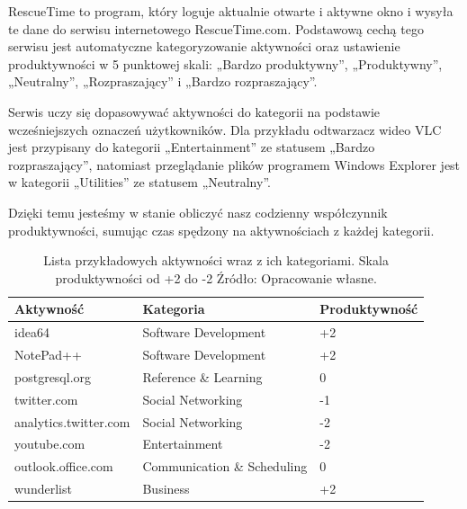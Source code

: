\documentclass[brudnopis]{xmgr}
\begin{document}
            RescueTime to program, który loguje aktualnie otwarte i aktywne okno
            i wysyła te dane do serwisu internetowego RescueTime.com.
            Podstawową cechą tego serwisu jest automatyczne kategoryzowanie aktywności oraz ustawienie produktywności w 5 punktowej skali:
            „Bardzo produktywny”, „Produktywny”, „Neutralny”, „Rozpraszający” i „Bardzo rozpraszający”.

            Serwis uczy się dopasowywać aktywności do kategorii na podstawie wcześniejszych oznaczeń użytkowników.
            Dla przykładu odtwarzacz wideo VLC jest przypisany do kategorii „Entertainment” ze statusem „Bardzo rozpraszający”,
            natomiast przeglądanie plików programem Windows Explorer jest w kategorii „Utilities” ze statusem „Neutralny”.

            Dzięki temu jesteśmy w stanie obliczyć nasz codzienny współczynnik produktywności,
            sumując czas spędzony na aktywnościach z każdej kategorii.

            \begin{table}[]
            \centering
            \begin{tabular}{lll}
                \hline
                \multicolumn{1}{l|}{Aktywność} & \multicolumn{1}{l|}{Kategoria} & Produktywność \\ \hline
                idea64                         & Software Development           & +2            \\
                NotePad++                      & Software Development           & +2            \\
                postgresql.org                 & Reference \& Learning          & 0             \\
                twitter.com                    & Social Networking              & -1            \\
                analytics.twitter.com          & Social Networking              & -2            \\
                youtube.com                    & Entertainment                  & -2            \\
                outlook.office.com             & Communication \& Scheduling    & 0             \\
                wunderlist                     & Business                       & +2
                \end{tabular}
                \caption{
                    Lista przykładowych aktywności wraz z ich kategoriami. Skala produktywności od +2 do -2
                    \newline Źródło: Opracowanie własne.
                }
                \label{RescueTime --- lista przykładowych aktywności}
            \end{table}
\end{document}
